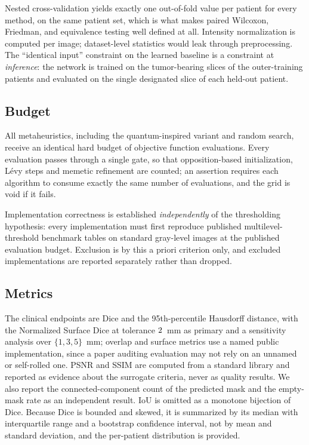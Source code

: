 Nested cross-validation yields exactly one out-of-fold value per patient for
every method, on the same patient set, which is what makes paired Wilcoxon,
Friedman, and equivalence testing well defined at all. Intensity normalization
is computed per image; dataset-level statistics would leak through preprocessing.
The ``identical input'' constraint on the learned baseline is a constraint at
\emph{inference}: the network is trained on the tumor-bearing slices of the
outer-training patients and evaluated on the single designated slice of each
held-out patient.

\subsection{Budget}

All metaheuristics, including the quantum-inspired variant and random search,
receive an identical hard budget of objective function evaluations. Every
evaluation passes through a single gate, so that opposition-based
initialization, Lévy steps and memetic refinement are counted; an assertion
requires each algorithm to consume exactly the same number of evaluations,
and the grid is void if it fails.

Implementation correctness is established \emph{independently} of the
thresholding hypothesis: every implementation must first reproduce published
multilevel-threshold benchmark tables on standard gray-level images at the
published evaluation budget. Exclusion is by this a priori criterion only, and
excluded implementations are reported separately rather than dropped.

\subsection{Metrics}

The clinical endpoints are Dice and the 95th-percentile Hausdorff distance,
with the Normalized Surface Dice at tolerance $2$~mm as primary and a
sensitivity analysis over $\{1,3,5\}$~mm; overlap and surface metrics use a named
public implementation, since a paper auditing evaluation may not rely on an
unnamed or self-rolled one. PSNR and SSIM are computed from a standard library
and reported as evidence about the surrogate criteria, never as quality results.
We also report the connected-component count of the predicted mask and the
empty-mask rate as an independent result. IoU is omitted as a monotone bijection
of Dice. Because Dice is bounded and skewed, it is summarized by its median with
interquartile range and a bootstrap confidence interval, not by mean and standard
deviation, and the per-patient distribution is provided.

